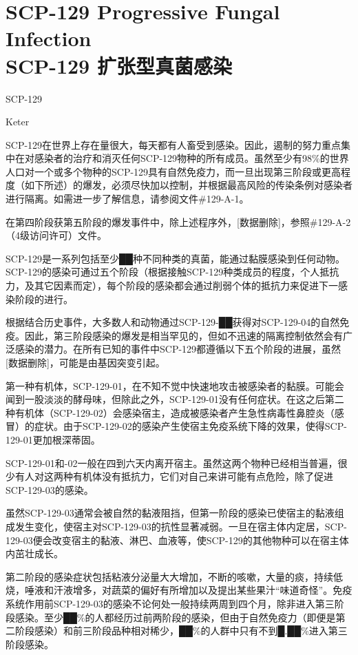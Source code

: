 \chapter[SCP-129 扩张型真菌感染]{
    SCP-129 Progressive Fungal Infection\\
    SCP-129 扩张型真菌感染
}

\label{chap:SCP-129}

SCP-129

Keter

SCP-129在世界上存在量很大，每天都有人畜受到感染。因此，遏制的努力重点集中在对感染者的治疗和消灭任何SCP-129物种的所有成员。虽然至少有98\%的世界人口对一个或多个物种的SCP-129具有自然免疫力，而一旦出现第三阶段或更高程度（如下所述）的爆发，必须尽快加以控制，并根据最高风险的传染条例对感染者进行隔离。如需进一步了解信息，请参阅文件\#129-A-1。

在第四阶段获第五阶段的爆发事件中，除上述程序外，{[}数据删除]，参照\#129-A-2（4级访问许可）文件。

SCP-129是一系列包括至少██种不同种类的真菌，能通过黏膜感染到任何动物。SCP-129的感染可通过五个阶段（根据接触SCP-129种类成员的程度，个人抵抗力，及其它因素而定），每个阶段的感染都会通过削弱个体的抵抗力来促进下一感染阶段的进行。

根据结合历史事件，大多数人和动物通过SCP-129-██获得对SCP-129-04的自然免疫。因此，第三阶段感染的爆发是相当罕见的，但如不迅速的隔离控制依然会有广泛感染的潜力。在所有已知的事件中SCP-129都遵循以下五个阶段的进展，虽然{[}数据删除]，可能是由基因突变引起。

\hr

第一种有机体，SCP-129-01，在不知不觉中快速地攻击被感染者的黏膜。可能会闻到一股淡淡的酵母味，但除此之外，SCP-129-01没有任何症状。在这之后第二种有机体（SCP-129-02）会感染宿主，造成被感染者产生急性病毒性鼻腔炎（感冒）的症状。由于SCP-129-02的感染产生使宿主免疫系统下降的效果，使得SCP-129-01更加根深蒂固。

SCP-129-01和-02一般在四到六天内离开宿主。虽然这两个物种已经相当普遍，很少有人对这两种有机体没有抵抗力，它们对自己来讲可能有点危险，除了促进SCP-129-03的感染。

虽然SCP-129-03通常会被自然的黏液阻挡，但第一阶段的感染已使宿主的黏液组成发生变化，使宿主对SCP-129-03的抗性显著减弱。一旦在宿主体内定居，SCP-129-03便会改变宿主的黏液、淋巴、血液等，使SCP-129的其他物种可以在宿主体内茁壮成长。

第二阶段的感染症状包括粘液分泌量大大增加，不断的咳嗽，大量的痰，持续低烧，唾液和汗液增多，对蔬菜的偏好有所增加以及提出某些果汁“味道奇怪”。免疫系统作用前SCP-129-03的感染不论何处一般持续两周到四个月，除非进入第三阶段感染。至少██\%的人都经历过前两阶段的感染，但由于自然免疫力（即便是第二阶段感染）和前三阶段品种相对稀少，██\%的人群中只有不到█.██\%进入第三阶段感染。

